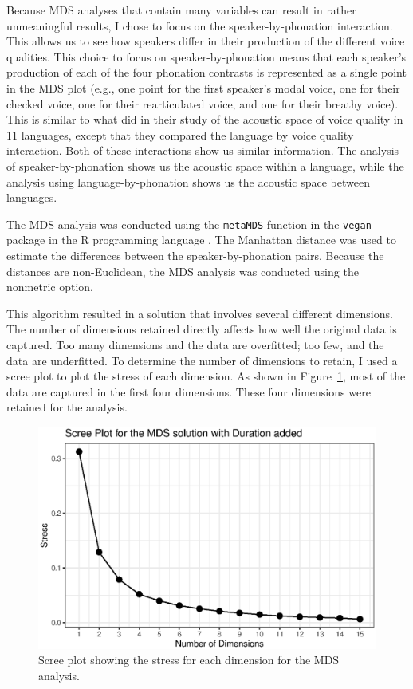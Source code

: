 Because MDS analyses that contain many variables can result in rather unmeaningful results, I chose to focus on the speaker-by-phonation interaction. This allows us to see how speakers differ in their production of the different voice qualities. This choice to focus on speaker-by-phonation means that each speaker's production of each of the four phonation contrasts is represented as a single point in the MDS plot (e.g., one point for the first speaker's modal voice, one for their checked voice, one for their rearticulated voice, and one for their breathy voice). This is similar to what \citet{keatingCrosslanguageAcousticSpace2023} did in their study of the acoustic space of voice quality in 11 languages, except that they compared the language by voice quality interaction. Both of these interactions show us similar information. The analysis of speaker-by-phonation shows us the acoustic space within a language, while the analysis using language-by-phonation shows us the acoustic space between languages.

The MDS analysis was conducted using the \texttt{metaMDS} function in the \texttt{vegan} package \citep{oksanenVeganCommunityEcology2025} in the R programming language \citep{rcoreteamLanguageEnvironmentStatistical2024}. The Manhattan distance was used to estimate the differences between the speaker-by-phonation pairs. Because the distances are non-Euclidean, the MDS analysis was conducted using the nonmetric option.

This algorithm resulted in a solution that involves several different dimensions. The number of dimensions retained directly affects how well the original data is captured. Too many dimensions and the data are overfitted; too few, and the data are underfitted. To determine the number of dimensions to retain, I used a scree plot to plot the stress of each dimension. As shown in Figure~\ref{fig:stress_plot}, most of the data are captured in the first four dimensions. These four dimensions were retained for the analysis.

\begin{figure}[h!]
    \centering
    \includegraphics[width = 0.9\linewidth]{images/MDS/stress_plot_dur.eps}
    \caption{Scree plot showing the stress for each dimension for the MDS analysis.}
    \label{fig:stress_plot}
\end{figure}

